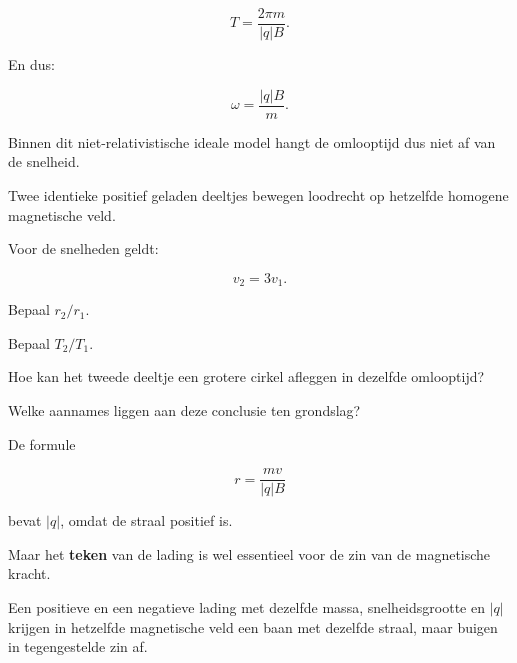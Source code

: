 \documentclass{ximera}
\begin{document}
\[
\boxed{
T=\frac{2\pi m}{|q|B}.
}
\]

En dus:

\[
\boxed{
\omega=\frac{|q|B}{m}.
}
\]

Binnen dit niet-relativistische ideale model hangt de omlooptijd dus
niet af van de snelheid.


\begin{oefening}{\oefG}

Twee identieke positief geladen deeltjes bewegen loodrecht op hetzelfde
homogene magnetische veld.

Voor de snelheden geldt:

\[
v_2=3v_1.
\]

\begin{question}
Bepaal $r_2/r_1$.
\end{question}

\begin{question}
Bepaal $T_2/T_1$.
\end{question}

\begin{question}
Hoe kan het tweede deeltje een grotere cirkel afleggen in dezelfde
omlooptijd?
\end{question}

\begin{question}
Welke aannames liggen aan deze conclusie ten grondslag?
\end{question}

\end{oefening}




De formule

\[
r=\frac{mv}{|q|B}
\]

bevat $|q|$, omdat de straal positief is.

Maar het \textbf{teken} van de lading is wel essentieel voor de zin van
de magnetische kracht.

Een positieve en een negatieve lading met dezelfde massa,
snelheidsgrootte en $|q|$ krijgen in hetzelfde magnetische veld een
baan met dezelfde straal, maar buigen in tegengestelde zin af.
\end{document}
